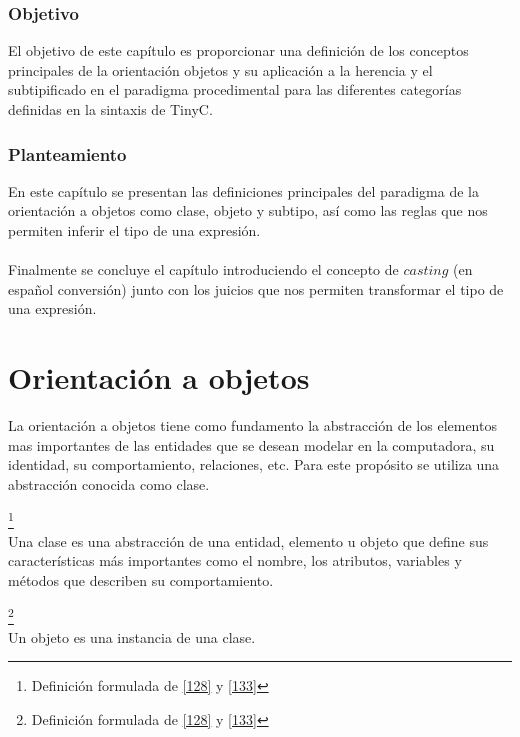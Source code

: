 \subsubsection{Objetivo}
El objetivo de este capítulo es proporcionar una definición de los conceptos principales de la orientación objetos y su aplicación a la herencia y el subtipificado en el paradigma procedimental para las diferentes categorías definidas en la sintaxis de \textsf{TinyC}.

\subsubsection{Planteamiento}
En este capítulo se presentan las definiciones principales del paradigma de la orientación a objetos como clase, objeto y subtipo, así como las reglas que nos permiten inferir el tipo de una expresión.\\\\
Finalmente se concluye el capítulo introduciendo el concepto de $casting$ (en español conversión) junto con los juicios que nos permiten transformar el tipo de una expresión. 

\section{Orientación a objetos}
La orientación a objetos tiene como fundamento la abstracción de los elementos mas importantes de las entidades que se desean modelar en la computadora, su identidad, su comportamiento, relaciones, etc. Para este propósito se utiliza una abstracción conocida como clase. 

\begin{definition}\footnote{Definición formulada de \hyperlink{128}{[128]} y \hyperlink{133}{[133]} }\\
    Una clase es una abstracción de una entidad, elemento u objeto que define sus características más importantes como el nombre, los atributos, variables y métodos que describen su comportamiento.
\end{definition}

\bigskip

\begin{definition}\footnote{Definición formulada de \hyperlink{128}{[128]} y \hyperlink{133}{[133]} }\\
    Un objeto es una instancia de una clase.
\end{definition}

\bigskip

